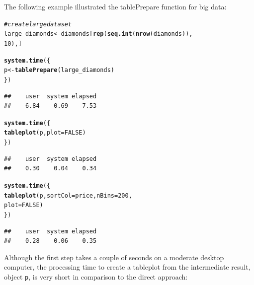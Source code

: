 \documentclass[11pt, fleqn, a4paper]{article}\usepackage[]{graphicx}\usepackage[]{color}
\makeatletter
\newcommand{\hlnum}[1]{\textcolor[rgb]{0.686,0.059,0.569}{#1}}%
\newcommand{\hlcom}[1]{\textcolor[rgb]{0.678,0.584,0.686}{\textit{#1}}}%
\newcommand{\hlstd}[1]{\textcolor[rgb]{0.345,0.345,0.345}{#1}}%
\newcommand{\hlkwb}[1]{\textcolor[rgb]{0.69,0.353,0.396}{#1}}%
\newcommand{\hlkwc}[1]{\textcolor[rgb]{0.333,0.667,0.333}{#1}}%
\newcommand{\hlkwd}[1]{\textcolor[rgb]{0.737,0.353,0.396}{\textbf{#1}}}%
\newenvironment{kframe}{%
 \def\at@end@of@kframe{}%
 \ifinner\ifhmode%
  \def\at@end@of@kframe{\end{minipage}}%
  \begin{minipage}{\columnwidth}%
 \fi\fi%
 \def\FrameCommand##1{\hskip\@totalleftmargin \hskip-\fboxsep
 \colorbox{shadecolor}{##1}\hskip-\fboxsep
     \hskip-\linewidth \hskip-\@totalleftmargin \hskip\columnwidth}%
 \MakeFramed {\advance\hsize-\width
   \@totalleftmargin\z@ \linewidth\hsize
   \@setminipage}}%
 {\par\unskip\endMakeFramed%
 \at@end@of@kframe}
\newenvironment{knitrout}{}{} %
\makeatother
\begin{document}
The following example illustrated the tablePrepare function for big data:

\begin{knitrout}
\color{fgcolor}\begin{kframe}
\begin{alltt}
\hlcom{# create large dataset}
\hlstd{large_diamonds} \hlkwb{<-} \hlstd{diamonds[}\hlkwd{rep}\hlstd{(}\hlkwd{seq.int}\hlstd{(}\hlkwd{nrow}\hlstd{(diamonds)),}
    \hlnum{10}\hlstd{), ]}

\hlkwd{system.time}\hlstd{(\{}
    \hlstd{p} \hlkwb{<-} \hlkwd{tablePrepare}\hlstd{(large_diamonds)}
\hlstd{\})}
\end{alltt}
\begin{verbatim}
##    user  system elapsed 
##    6.84    0.69    7.53
\end{verbatim}
\begin{alltt}
\hlkwd{system.time}\hlstd{(\{}
    \hlkwd{tableplot}\hlstd{(p,} \hlkwc{plot} \hlstd{=} \hlnum{FALSE}\hlstd{)}
\hlstd{\})}
\end{alltt}
\begin{verbatim}
##    user  system elapsed 
##    0.30    0.04    0.34
\end{verbatim}
\begin{alltt}
\hlkwd{system.time}\hlstd{(\{}
    \hlkwd{tableplot}\hlstd{(p,} \hlkwc{sortCol} \hlstd{= price,} \hlkwc{nBins} \hlstd{=} \hlnum{200}\hlstd{,}
        \hlkwc{plot} \hlstd{=} \hlnum{FALSE}\hlstd{)}
\hlstd{\})}
\end{alltt}
\begin{verbatim}
##    user  system elapsed 
##    0.28    0.06    0.35
\end{verbatim}
\end{kframe}
\end{knitrout}


Although the first step takes a couple of seconds on a moderate desktop computer, the processing time to create a tableplot from the intermediate result, object {\tt p}, is very short in comparison to the direct approach:
\end{document}
